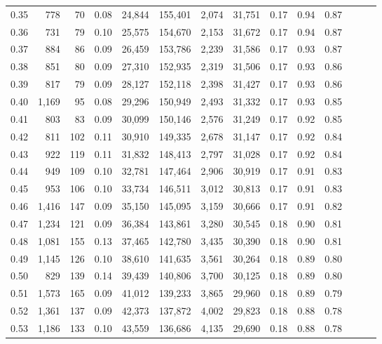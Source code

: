 \begin{tabular}{rrrrrrrrrrrrrr}
0.35 &    778 &     70 &  0.08 &   24,844 &  155,401 &   2,074 &  31,751 &  0.17 &  0.94 &      0.87 \\
0.36 &    731 &     79 &  0.10 &   25,575 &  154,670 &   2,153 &  31,672 &  0.17 &  0.94 &      0.87 \\
0.37 &    884 &     86 &  0.09 &   26,459 &  153,786 &   2,239 &  31,586 &  0.17 &  0.93 &      0.87 \\
0.38 &    851 &     80 &  0.09 &   27,310 &  152,935 &   2,319 &  31,506 &  0.17 &  0.93 &      0.86 \\
0.39 &    817 &     79 &  0.09 &   28,127 &  152,118 &   2,398 &  31,427 &  0.17 &  0.93 &      0.86 \\
0.40 &  1,169 &     95 &  0.08 &   29,296 &  150,949 &   2,493 &  31,332 &  0.17 &  0.93 &      0.85 \\
0.41 &    803 &     83 &  0.09 &   30,099 &  150,146 &   2,576 &  31,249 &  0.17 &  0.92 &      0.85 \\
0.42 &    811 &    102 &  0.11 &   30,910 &  149,335 &   2,678 &  31,147 &  0.17 &  0.92 &      0.84 \\
0.43 &    922 &    119 &  0.11 &   31,832 &  148,413 &   2,797 &  31,028 &  0.17 &  0.92 &      0.84 \\
0.44 &    949 &    109 &  0.10 &   32,781 &  147,464 &   2,906 &  30,919 &  0.17 &  0.91 &      0.83 \\
0.45 &    953 &    106 &  0.10 &   33,734 &  146,511 &   3,012 &  30,813 &  0.17 &  0.91 &      0.83 \\
0.46 &  1,416 &    147 &  0.09 &   35,150 &  145,095 &   3,159 &  30,666 &  0.17 &  0.91 &      0.82 \\
0.47 &  1,234 &    121 &  0.09 &   36,384 &  143,861 &   3,280 &  30,545 &  0.18 &  0.90 &      0.81 \\
0.48 &  1,081 &    155 &  0.13 &   37,465 &  142,780 &   3,435 &  30,390 &  0.18 &  0.90 &      0.81 \\
0.49 &  1,145 &    126 &  0.10 &   38,610 &  141,635 &   3,561 &  30,264 &  0.18 &  0.89 &      0.80 \\
0.50 &    829 &    139 &  0.14 &   39,439 &  140,806 &   3,700 &  30,125 &  0.18 &  0.89 &      0.80 \\
0.51 &  1,573 &    165 &  0.09 &   41,012 &  139,233 &   3,865 &  29,960 &  0.18 &  0.89 &      0.79 \\
0.52 &  1,361 &    137 &  0.09 &   42,373 &  137,872 &   4,002 &  29,823 &  0.18 &  0.88 &      0.78 \\
0.53 &  1,186 &    133 &  0.10 &   43,559 &  136,686 &   4,135 &  29,690 &  0.18 &  0.88 &      0.78 \\

\end{tabular}
